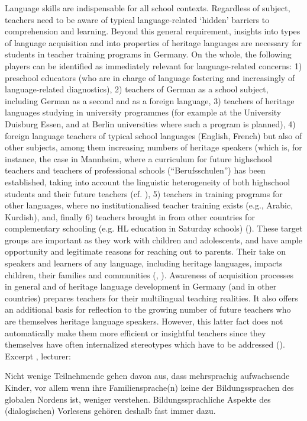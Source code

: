 \documentclass[output=paper,colorlinks,citecolor=brown]{langscibook}
\begin{document}
Language skills are indispensable for all school contexts. Regardless of subject, teachers need to be aware of typical language-related ‘hidden’ barriers to comprehension and learning. Beyond this general requirement, insights into types of language acquisition and into properties of heritage languages are necessary for students in teacher training programs in Germany.
On the whole, the following players can be identified as immediately relevant for language-related concerns:
1) preschool educators (who are in charge of language fostering and increasingly of language-related diagnostics), 2) teachers of German as a school subject, including German as a second and as a foreign language, 3) teachers of heritage languages studying in university programmes (for example at the University Duisburg Essen, and at Berlin universities where such a program is planned), 4) foreign language teachers of typical school languages (English, French) but also of other subjects, among them increasing numbers of heritage speakers (which is, for instance, the case in Mannheim, where a curriculum for future highschool teachers and teachers of professional schools (“Berufsschulen”) has been established, taking into account the linguistic heterogeneity of both highschool students and their future teachers (cf. \cite{Karst&al.2021}), 5) teachers in training programs for other languages, where no institutionalised teacher training exists (e.g., Arabic, Kurdish), and, finally 6) teachers brought in from other countries for complementary schooling (e.g. HL education in Saturday schools) (\cite{Woerfel&al.2020}).
These target groups are important as they work with children and adolescents, and have ample opportunity and legitimate reasons for reaching out to parents. Their take on speakers and learners of any language, including heritage languages, impacts children, their families and communities (\cite{DeKorne2017}, \cite{Seals2018}).
Awareness of acquisition processes in general and of heritage language development in Germany (and in other countries) prepares teachers for their multilingual teaching realities. It also offers an additional basis for reflection to the growing number of future teachers who are themselves heritage language speakers. However, this latter fact does not automatically make them more efficient or insightful teachers since they themselves have often internalized stereotypes which have to be addressed (\cite{Thoma&Ofner2021}).
Excerpt , lecturer: 
\largerpage

\ea\label{ex:04:5}
Nicht wenige Teilnehmende gehen davon aus, dass mehrsprachig aufwachsende Kinder, vor allem wenn ihre Familiensprache(n) keine der Bildungssprachen des globalen Nordens ist, weniger verstehen. Bildungssprachliche Aspekte des (dialogischen) Vorlesens gehören deshalb fast immer dazu.\\
\end{document}
